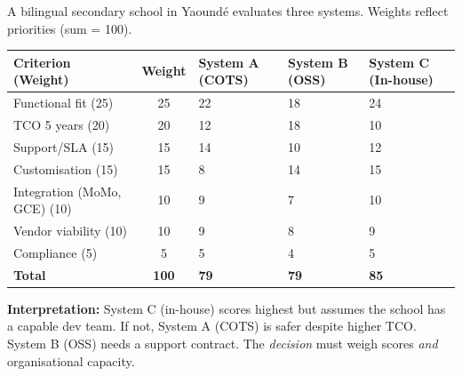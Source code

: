 \documentclass[11pt]{article}
\begin{document}
\begin{exemplebox}
A bilingual secondary school in Yaoundé evaluates three systems. Weights reflect priorities (sum = 100).

\begin{center}
\begin{tabularx}{\linewidth}{|l|c|X|X|X|}\hline
\textbf{Criterion (Weight)} & \textbf{Weight} & \textbf{System A (COTS)} & \textbf{System B (OSS)} & \textbf{System C (In-house)} \\ \hline
Functional fit (25) & 25 & 22 & 18 & 24 \\ \hline
TCO 5 years (20) & 20 & 12 & 18 & 10 \\ \hline
Support/SLA (15) & 15 & 14 & 10 & 12 \\ \hline
Customisation (15) & 15 & 8 & 14 & 15 \\ \hline
Integration (MoMo, GCE) (10) & 10 & 9 & 7 & 10 \\ \hline
Vendor viability (10) & 10 & 9 & 8 & 9 \\ \hline
Compliance (5) & 5 & 5 & 4 & 5 \\ \hline \textbf{Total} & \textbf{100} & \textbf{79} & \textbf{79} & \textbf{85} \\ \hline
\end{tabularx}
\end{center}
\textbf{Interpretation:} System C (in-house) scores highest but assumes the school has a capable dev team. If not, System A (COTS) is safer despite higher TCO. System B (OSS) needs a support contract. The \emph{decision} must weigh scores \emph{and} organisational capacity.
\end{exemplebox}
\end{document}
